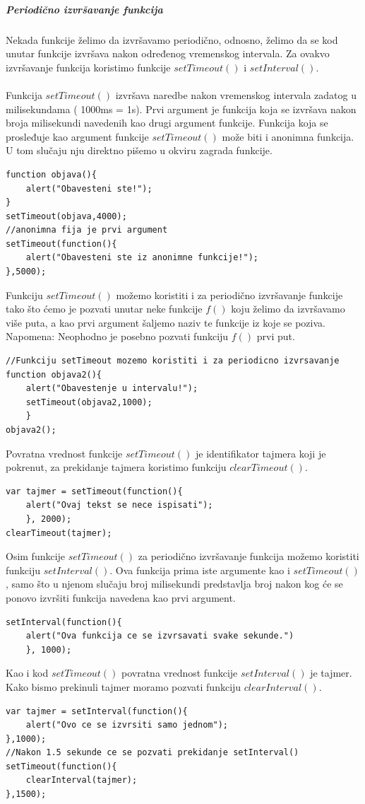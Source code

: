 \documentclass[a4paper]{article}
\begin{document}
\subparagraph{Periodično izvršavanje funkcija}
Nekada funkcije želimo da izvršavamo periodično, odnosno, želimo da se kod unutar funkcije izvršava nakon određenog vremenskog intervala. Za ovakvo izvršavanje funkcija koristimo funkcije $setTimeout()$ i $setInterval()$.\\\\
Funkcija $setTimeout()$ izvršava naredbe nakon vremenskog intervala zadatog u milisekundama ( 1000ms = 1s). Prvi argument je funkcija koja se izvršava nakon broja milisekundi navedenih kao drugi argument funkcije. Funkcija koja se prosleđuje kao argument funkcije $setTimeout()$ može biti i anonimna funkcija. U tom slučaju nju direktno pišemo u okviru zagrada funkcije. 
\begin{lstlisting}[backgroundcolor = \color{lightgray}]
function objava(){
	alert("Obavesteni ste!");
}
setTimeout(objava,4000);
//anonimna fija je prvi argument
setTimeout(function(){
	alert("Obavesteni ste iz anonimne funkcije!");
},5000);
\end{lstlisting}
Funkciju $setTimeout()$ možemo koristiti i za periodično izvršavanje funkcije tako što ćemo je pozvati unutar neke funkcije $f()$ koju želimo da izvršavamo više puta, a kao prvi argument šaljemo naziv te funkcije iz koje se poziva. Napomena: Neophodno je posebno pozvati funkciju $f()$ prvi put.
\begin{lstlisting}[backgroundcolor = \color{lightgray}]
 //Funkciju setTimeout mozemo koristiti i za periodicno izvrsavanje
function objava2(){
	alert("Obavestenje u intervalu!");
    setTimeout(objava2,1000);
	}
objava2();
\end{lstlisting}
Povratna vrednost funkcije $setTimeout()$ je identifikator tajmera koji je pokrenut, za prekidanje tajmera koristimo funkciju $clearTimeout()$.
\begin{lstlisting}[backgroundcolor = \color{lightgray}]
var tajmer = setTimeout(function(){
	alert("Ovaj tekst se nece ispisati");
	}, 2000);
clearTimeout(tajmer);
\end{lstlisting}
Osim funkcije $setTimeout()$ za periodično izvršavanje funkcija možemo koristiti funkciju $setInterval()$. Ova funkcija prima iste argumente kao i $setTimeout()$, samo što u njenom slučaju broj milisekundi predstavlja broj nakon kog će se ponovo izvršiti funkcija navedena kao prvi argument.
\begin{lstlisting}[backgroundcolor = \color{lightgray}]
setInterval(function(){
	alert("Ova funkcija ce se izvrsavati svake sekunde.")
	}, 1000);
\end{lstlisting}
Kao i kod $setTimeout()$ povratna vrednost funkcije $setInterval()$ je tajmer. Kako bismo prekinuli tajmer moramo pozvati funkciju $clearInterval()$.
\begin{lstlisting}[backgroundcolor = \color{lightgray}]
var tajmer = setInterval(function(){
	alert("Ovo ce se izvrsiti samo jednom");
},1000);
//Nakon 1.5 sekunde ce se pozvati prekidanje setInterval()
setTimeout(function(){
	clearInterval(tajmer);
},1500);
\end{lstlisting}
\end{document}
